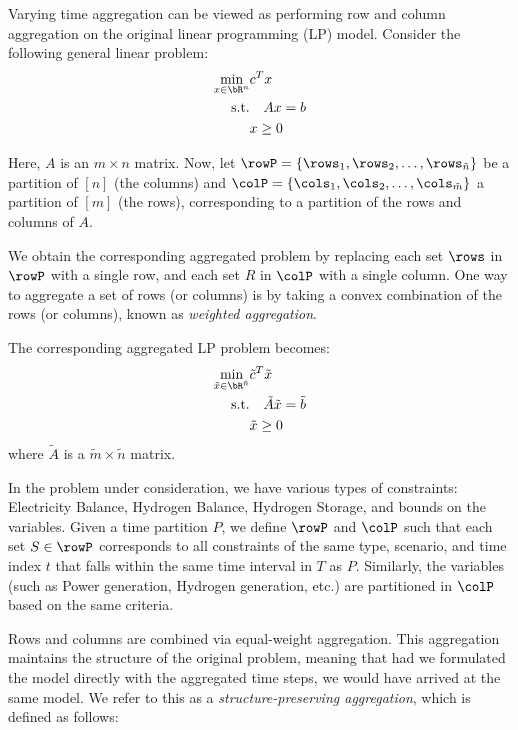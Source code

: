 {\color{violet}
Varying time aggregation can be viewed as performing row and column aggregation on the original linear programming (LP) model. Consider the following general linear problem:
\begin{align}
\label{eq:LP}
\min_{x \in \bR^{n}} &c^T x \\ 
\text{s.t.} &\quad Ax = b \\
&x \geq 0
\end{align}

Here, \(A\) is an \(m \times n\) matrix. Now, let \(\rowP = \{\rows_1, \rows_2, \ldots, \rows_{\tilde{n}}\}\) be a partition of \([n]\) (the columns) and \(\colP = \{\cols_1, \cols_2, \ldots, \cols_{\tilde{m}}\}\) a partition of \([m]\) (the rows), corresponding to a partition of the rows and columns of \(A\).

We obtain the corresponding aggregated problem by replacing each set \(\rows\) in \(\rowP\) with a single row, and each set \(R\) in \(\colP\) with a single column. One way to aggregate a set of rows (or columns) is by taking a convex combination of the rows (or columns), known as \emph{weighted aggregation}.

The corresponding aggregated LP problem becomes:
\begin{align}
\label{eq:LPaggr}
\min_{\tilde{x} \in \bR^{\tilde{n}}} &\tilde{c}^T \tilde{x} \\ 
\text{s.t.} &\quad \tilde{A} \tilde{x} = \tilde{b} \\ 
&\tilde{x} \geq 0 
\end{align}
where \(\tilde{A}\) is a \(\tilde{m}\times \tilde{n}\) matrix.

In the problem under consideration, we have various types of constraints: Electricity Balance, Hydrogen Balance, Hydrogen Storage, and bounds on the variables. Given a time partition \(P\), we define \(\rowP\) and \(\colP\) such that each set \(S \in \rowP\) corresponds to all constraints of the same type, scenario, and time index \(t\) that falls within the same time interval in \(T\) as \(P\). Similarly, the variables (such as Power generation, Hydrogen generation, etc.) are partitioned in \(\colP\) based on the same criteria.

Rows and columns are combined via equal-weight aggregation. This aggregation maintains the structure of the original problem, 
meaning that had we formulated the model directly with the aggregated time steps, we would have arrived at the same model.
 We refer to this as a \emph{structure-preserving aggregation}, which is defined as follows:

}
